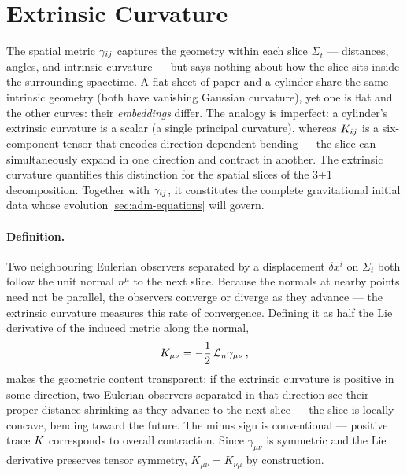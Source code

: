 \section{Extrinsic Curvature}
\label{sec:adm-extrinsic-curvature}

The spatial metric $\gamma_{ij}$ captures the geometry within each
slice $\Sigma_t$ --- distances, angles, and intrinsic curvature --- but
says nothing about how the slice sits inside the surrounding spacetime.
A flat sheet of paper and a cylinder share the same intrinsic geometry
(both have vanishing Gaussian curvature), yet one is flat and the other
curves: their \emph{embeddings} differ.  The analogy is imperfect: a
cylinder's extrinsic curvature is a scalar (a single principal
curvature), whereas $K_{ij}$ is a six-component tensor that encodes
direction-dependent bending --- the slice can simultaneously expand in
one direction and contract in another.  The extrinsic curvature
quantifies this distinction for the spatial slices of the 3+1
decomposition.  Together with $\gamma_{ij}$, it constitutes the
complete gravitational initial data whose evolution
\cref{sec:adm-equations} will govern.

\paragraph{Definition.}

Two neighbouring Eulerian observers separated by a displacement
$\delta x^i$ on $\Sigma_t$ both follow the unit normal $n^\mu$ to the
next slice.  Because the normals at nearby points need not be parallel,
the observers converge or diverge as they advance --- the extrinsic
curvature measures this rate of convergence.  Defining it as half the Lie
derivative of the induced metric along the normal,
%
\begin{equation}
  K_{\mu\nu} = -\frac{1}{2}\,\mathcal{L}_{n}\gamma_{\mu\nu} \,,
  \label{eq:adm-extrinsic-def}
\end{equation}
%
makes the geometric content transparent: if the extrinsic curvature is
positive in some direction, two Eulerian observers separated in that
direction see their proper distance shrinking as they advance to the
next slice --- the slice is locally concave, bending toward the future.
The minus sign is conventional --- positive trace $K$
corresponds to overall contraction.  Since $\gamma_{\mu\nu}$ is
symmetric and the Lie derivative preserves tensor symmetry,
$K_{\mu\nu} = K_{\nu\mu}$ by construction.

